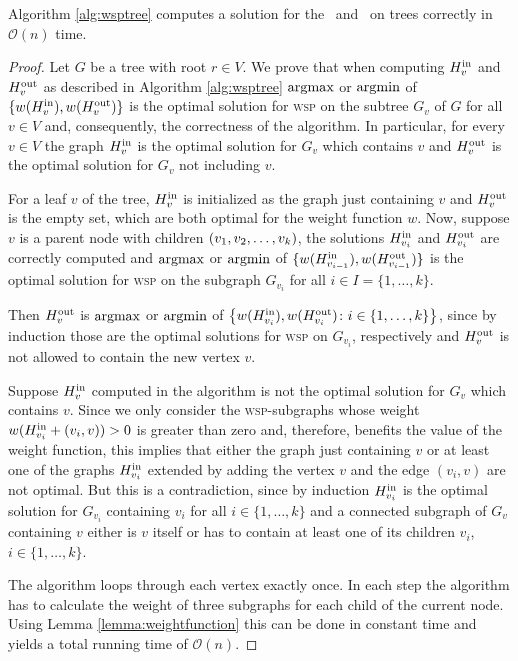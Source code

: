 \begin{theorem}
	\label{thm:wsptree}
	Algorithm \ref{alg:wsptree} computes a solution for the \WSP\ and \WISP\ on trees correctly in $\mathcal{O}(n)$ time.
\end{theorem}
\begin{proof}
	Let $G$ be a tree with root $r \in V$. We prove that when computing $\HPath{v}{in}$ and $\HPath{v}{out}$ as described in Algorithm \ref{alg:wsptree} $\argmax$ or $\argmin$ of $\{ w(\HPath{v}{in}), w(\HPath{v}{out}) \}$ is the optimal solution for \textsc{wsp} on the subtree $G_v$ of $G$ for all $v \in V$ and, consequently, the correctness of the algorithm. In particular, for every $v \in V$ the graph $\HPath{v}{in}$ is the optimal solution for $G_v$ which contains $v$ and $\HPath{v}{out}$ is the optimal solution for $G_v$ not including $v$.\medskip
	
	For a leaf $v$ of the tree, $\HPath{v}{in}$ is initialized as the graph just containing $v$ and $\HPath{v}{out}$ is the empty set, which are both optimal for the weight function $w$. Now, suppose $v$ is a parent node with children $\Vector[v]{k}$, the solutions  $\HPath{v_i}{in}$ and $\HPath{v_i}{out}$ are correctly computed and $\argmax$ or $\argmin$ of $\{ w(\HPath{v_{i-1}}{in}), w(\HPath{v_{i-1}}{out}) \}$ is the optimal solution for \textsc{wsp} on the subgraph $G_{v_i}$ for all $i \in I = \{1, \ldots, k\}$.\medskip
		
	Then $\HPath{v}{out}$ is $\argmax$ or $\argmin$ of $\left \{ w(\HPath{v_i}{in}), w(\HPath{v_i}{out}) \colon i\in \{1,\ldots,k\} \right \}$, since by induction those are the optimal solutions for \textsc{wsp} on $G_{v_i}$, respectively and $\HPath{v}{out}$ is not allowed to contain the new vertex $v$.\medskip
	
	Suppose $\HPath{v}{in}$ computed in the algorithm is not the optimal solution for $G_v$ which contains $v$. Since we only consider the \textsc{wsp}-subgraphs whose weight $w(\HPath{v_i}{in} + (v_i, v)) > 0$ is greater than zero and, therefore,  benefits the value of the weight function, this implies that either the graph just containing $v$ or at least one of the graphs $\HPath{v_{i}}{in}$ extended by adding the vertex $v$ and the edge $(v_{i}, v)$ are not optimal. But this is a contradiction, since by induction $\HPath{v_{i}}{in}$ is the optimal solution for $G_{v_i}$ containing $v_{i}$ for all $i \in \{1,\ldots,k\}$ and a connected subgraph of $G_v$ containing $v$ either is $v$ itself or has to contain at least one of its children $v_i$, $i \in \{1,\ldots,k\}$.\medskip
		
	The algorithm loops through each vertex exactly once. In each step the algorithm has to calculate the weight of three subgraphs for each child of the current node. Using Lemma \ref{lemma:weightfunction} this can be done in constant time and yields a total running time of $\mathcal{O}(n)$.
\end{proof}


